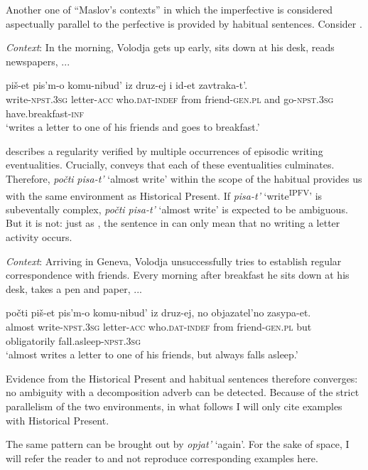 \documentclass[output=paper,colorlinks,citecolor=brown]{langscibook}
\begin{document}
Another one of “Maslov’s contexts” in which the imperfective is considered aspectually parallel to the perfective is provided by habitual sentences. Consider . 

\eanoraggedright    \textit{Context}: In the morning, Volodja gets up early, sits down at his desk, reads newspapers, ...

\gll   piš-et  pis’m-o   komu-nibud’   iz   druz-ej   i id-et     zavtraka-t’.\\
  write-\textsc{npst.3sg}  letter-\textsc{acc}  who.\textsc{dat-indef}   from  friend-\textsc{gen.pl}   and go-\textsc{npst.3sg}  have.breakfast-\textsc{inf}\\
\glt ‘writes a letter to one of his friends and goes to breakfast.’\label{tat:ex:44}
\z

\noindent {} describes a regularity verified by multiple occurrences of episodic writing eventualities. Crucially,  conveys that each of these eventualities culminates. Therefore, \textit{počti} \textit{pisa-t’} ‘almost write’ within the scope of the habitual provides us with the same environment as Historical Present. If \textit{pisa-t’} ‘write\textsuperscript{IPFV}’ is subeventally complex, \textit{počti pisa-t’} ‘almost write’ is expected to be ambiguous. But it is not: just as , the sentence in  can only mean that no writing a letter activity occurs.

\eanoraggedright    \textit{Context}: Arriving in Geneva, Volodja unsuccessfully tries to establish regular correspondence with friends. Every morning after breakfast he sits down at his desk, takes a pen and paper, ...\label{tat:ex:45}

\gll  počti piš-et  pis’m-o   komu-nibud’   iz   druz-ej, no   objazatel’no   zasypa-et. \\
  almost   write-\textsc{npst.3sg}  letter-\textsc{acc}  who.\textsc{dat-indef}   from  friend-\textsc{gen.pl}  but   obligatorily   fall.asleep-\textsc{npst.3sg}\\
\glt ‘almost writes a letter to one of his friends, but always falls asleep.’
\z

\noindent Evidence from the Historical Present and habitual sentences therefore converges: no ambiguity with a decomposition adverb can be detected. Because of the strict parallelism of the two environments, in what follows I will only cite examples with Historical Present.

The same pattern can be brought out by \textit{opjat’} ‘again’. For the sake of space, I will refer the reader to \citet[493--497]{Tatevosov2016} and not reproduce corresponding examples here. 
\end{document}
